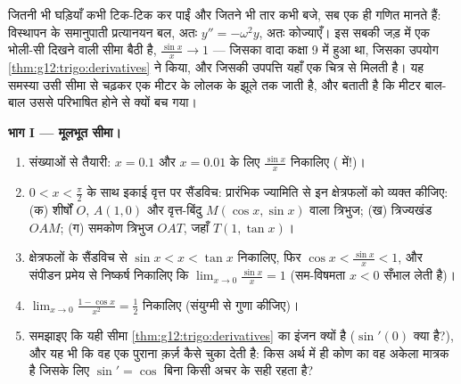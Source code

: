 \begin{problem}
\label{pb:g12:trigo:1}
जितनी भी घड़ियाँ कभी टिक-टिक कर पाईं और जितने भी तार कभी बजे, सब एक ही गणित
मानते हैं: विस्थापन के समानुपाती प्रत्यानयन बल, अतः  $y'' = -\omega^2 y$, अतः
कोज्याएँ। इस सबकी जड़ में एक भोली-सी दिखने वाली सीमा बैठी है, $\frac{\sin x}{x} \to 1$ --- जिसका
वादा कक्षा 9 में हुआ था, जिसका उपयोग \cref{thm:g12:trigo:derivatives} ने किया, और जिसकी उपपत्ति यहाँ एक
चित्र से मिलती है। यह समस्या उसी सीमा से चढ़कर एक मीटर के लोलक के झूले तक
जाती है, और बताती है कि मीटर बाल-बाल उससे परिभाषित होने से क्यों बच गया।

\medskip
\noindent\textbf{भाग I --- मूलभूत सीमा।}
\begin{enumerate}
  \item संख्याओं से तैयारी: $x = 0.1$ और $x = 0.01$ के लिए $\frac{\sin x}{x}$ निकालिए (
        में!)।
  \item $0 < x < \frac\pi2$ के साथ इकाई वृत्त पर सैंडविच: प्रारंभिक ज्यामिति से इन
        क्षेत्रफलों को व्यक्त कीजिए: (क) शीर्षों $O$, $A(1,0)$ और वृत्त-बिंदु
        $M(\cos x, \sin x)$ वाला त्रिभुज; (ख) त्रिज्यखंड $OAM$; (ग) समकोण त्रिभुज
        $OAT$, जहाँ $T(1, \tan x)$।
  \item क्षेत्रफलों के सैंडविच से $\sin x < x < \tan x$ निकालिए, फिर $\cos x < \frac{\sin x}{x} < 1$, और संपीडन प्रमेय
        से निष्कर्ष निकालिए कि $\lim_{x \to 0} \frac{\sin x}{x} = 1$ (सम-विषमता $x < 0$ सँभाल लेती है)।
  \item $\lim_{x \to 0} \frac{1 - \cos x}{x^2} = \frac12$ निकालिए (संयुग्मी से गुणा कीजिए)।
  \item समझाइए कि यही सीमा \cref{thm:g12:trigo:derivatives} का इंजन क्यों है ($\sin'(0)$ क्या है?), और यह
        भी कि वह एक पुराना क़र्ज़ कैसे चुका देती है: किस अर्थ में
        \emph{} ही कोण का वह अकेला मात्रक है जिसके लिए $\sin' = \cos$ बिना किसी
        अचर के सही रहता है?
\end{enumerate}


\end{problem}
